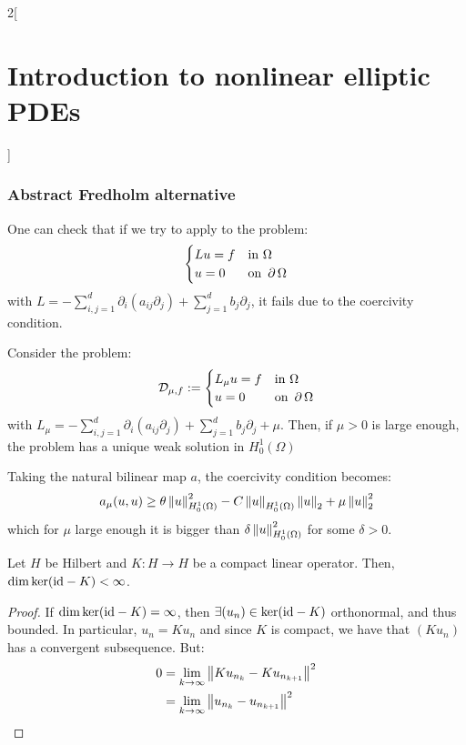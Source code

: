 \documentclass[../../../main_math.tex]{subfiles}
\begin{document}
\begin{multicols}{2}[\section{Introduction to nonlinear elliptic PDEs}]
  \subsubsection{Abstract Fredholm alternative}
  \begin{remark}
    One can check that if we try to apply  to the problem:
    $$
      \begin{cases}
        Lu=f & \text{in }\Omega      \\
        u=0  & \text{on }\operatorname{\partial}{\Omega}
      \end{cases}
    $$
    with $L=-\sum_{i,j=1}^d\partial_i(a_{ij}\partial_j)+\sum_{j=1}^db_j\partial_j$, it fails due to the coercivity condition.
  \end{remark}
  \begin{proposition}\label{INEPDE:Lmu}
    Consider the problem:
    $$
      \mathcal{D}_{\mu,f}:=\begin{cases}
        L_\mu u=f & \text{in }\Omega      \\
        u=0       & \text{on }\operatorname{\partial}{\Omega}
      \end{cases}
    $$
    with $L_\mu=-\sum_{i,j=1}^d\partial_i(a_{ij}\partial_j)+\sum_{j=1}^db_j\partial_j+\mu$. Then, if $\mu>0$ is large enough, the problem has a unique weak solution in $H_0^1(\Omega)$
  \end{proposition}
  \begin{sproof}
    Taking the natural bilinear map $a$, the coercivity condition becomes:
    $$
      a_\mu(u,u)\geq \theta \left\|u\right\|_{H_0^1(\Omega)}^2-C\left\|u\right\|_{H_0^1(\Omega)}\left\|u\right\|_2 + \mu \left\|u\right\|_2^2
    $$
    which for $\mu$ large enough it is bigger than $\delta \left\|u\right\|_{H_0^1(\Omega)}^2$ for some $\delta>0$.
  \end{sproof}
  \begin{lemma}\label{INEPDE:lemma1_fredholm}
    Let $H$ be Hilbert and $K:H\to H$ be a compact linear operator. Then, $\dim \ker(\mathrm{id}-K)<\infty$.
  \end{lemma}
  \begin{proof}
    If $\dim\ker(\mathrm{id}-K)=\infty$, then $\exists (u_n)\in \ker(\mathrm{id}-K)$ orthonormal, and thus bounded. In particular, $u_n=Ku_n$ and since $K$ is compact, we have that $(Ku_n)$ has a convergent subsequence. But:
    \begin{align*}
      0 & =\lim_{k\to\infty}\norm{Ku_{n_k}-Ku_{n_{k+1}}}^2        \\
        & =\lim_{k\to\infty}\norm{u_{n_k}-u_{n_{k+1}}}^2          \\

\end{align*}
\end{proof}
\end{multicols}
\end{document}
